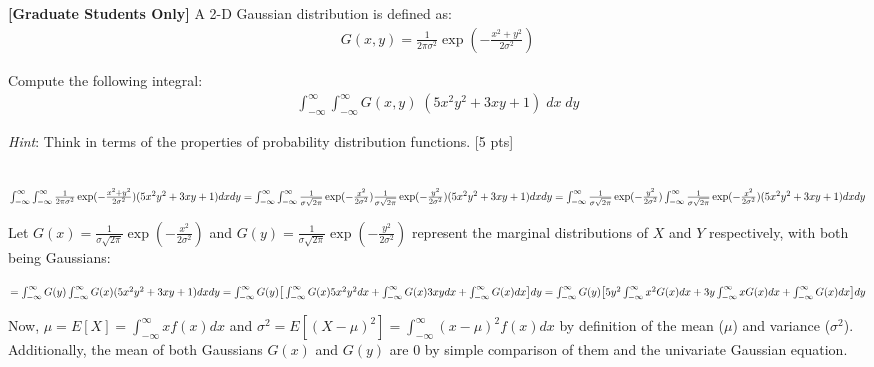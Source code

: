 \textbf{[Graduate Students Only]} A 2-D Gaussian distribution is defined as:
\begin{align*}
    G(x,y) = \left.
    \frac{1}{2\pi \sigma ^ 2} \exp{\left(-\frac{x^2 + y^2}{2 \sigma^2}\right)}
   \right.
\end{align*}

Compute the following integral:
\begin{align*}
    \int_{-\infty}^{\infty} \int_{-\infty}^{\infty} G(x, y)\; (5x^2 y^2 + 3xy + 1)\;dx\;dy
\end{align*}

\emph{Hint}: Think in terms of the properties of probability distribution functions. [5 pts]

\begin{solution} \ \\
$\int_{-\infty}^\infty \int_{-\infty}^\infty \frac{1}{2\pi\sigma^2}\exp(-\frac{x^2+y^2}{2\sigma^2})(5x^2y^2+3xy+1) dx dy\\
= \int_{-\infty}^\infty \int_{-\infty}^\infty \frac{1}{\sigma\sqrt{2\pi}}\exp(-\frac{x^2}{2\sigma^2})\frac{1}{\sigma\sqrt{2\pi}}\exp(-\frac{y^2}{2\sigma^2})(5x^2y^2+3xy+1) dx dy\\
= \int_{-\infty}^\infty \frac{1}{\sigma\sqrt{2\pi}}\exp(-\frac{y^2}{2\sigma^2}) \int_{-\infty}^\infty \frac{1}{\sigma\sqrt{2\pi}}\exp(-\frac{x^2}{2\sigma^2})(5x^2y^2+3xy+1) dx dy$

Let $G(x) = \frac{1}{\sigma\sqrt{2\pi}}\exp(-\frac{x^2}{2\sigma^2})$ and $G(y) = \frac{1}{\sigma\sqrt{2\pi}}\exp(-\frac{y^2}{2\sigma^2})$ represent the marginal distributions of $X$ and $Y$ respectively, with both being Gaussians:

$= \int_{-\infty}^\infty G(y) \int_{-\infty}^\infty G(x)(5x^2y^2+3xy+1) dx dy\\
= \int_{-\infty}^\infty G(y) \big[\int_{-\infty}^\infty G(x)5x^2y^2 dx + \int_{-\infty}^\infty G(x)3xy dx + \int_{-\infty}^\infty G(x) dx\big] dy\\
= \int_{-\infty}^\infty G(y) \big[5y^2\int_{-\infty}^\infty x^2G(x) dx + 3y\int_{-\infty}^\infty xG(x) dx + \int_{-\infty}^\infty G(x) dx\big] dy$

Now, $\mu = E[X] = \int_{-\infty}^\infty xf(x)dx$ and $\sigma^2 = E[(X - \mu)^2] = \int_{-\infty}^\infty (x-\mu)^2f(x)dx$ by definition of the mean ($\mu$) and variance ($\sigma^2$). Additionally, the mean of both Gaussians $G(x)$ and $G(y)$ are 0 by simple comparison of them and the univariate Gaussian equation.


\end{solution}
